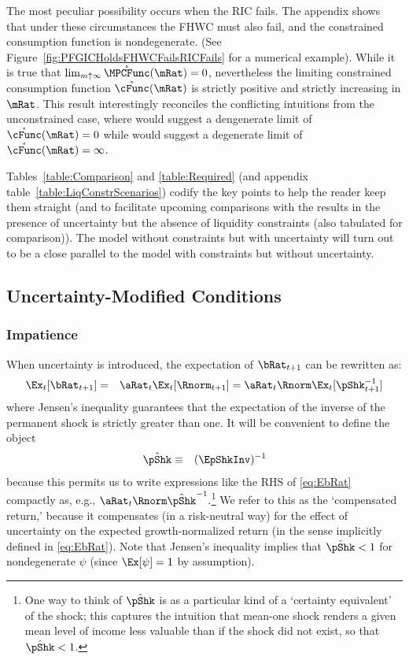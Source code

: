 \documentclass[titlepage]{\econtex}\providecommand{\texname}{BufferStockTheory}
\begin{document}
The most peculiar possibility occurs when the RIC fails.  The appendix shows that under these circumstances the FHWC
must also fail, and the constrained consumption function is nondegenerate.  (See Figure~\ref{fig:PFGICHoldsFHWCFailsRICFails} for a numerical example).  While it is true that $\lim_{m \uparrow \infty}
\mathring{\MPCFunc}(\mRat) = 0$, nevertheless the limiting constrained
consumption function $\mathring{\cFunc}(\mRat)$ is strictly positive
and strictly increasing in $\mRat$.  This result interestingly
reconciles the conflicting intuitions from the unconstrained case,
where  would suggest a dengenerate limit of
$\mathring{\cFunc}(\mRat)=0$ while  would suggest a
degenerate limit of $\mathring{\cFunc}(\mRat)=\infty$.

Tables~\ref{table:Comparison} and \ref{table:Required} (and appendix
table~\ref{table:LiqConstrScenarios}) codify the key points to help
the reader keep them straight (and to facilitate upcoming comparisons
with the results in the presence of uncertainty
but the absence of liquidity constraints (also tabulated for comparison)).  The model without constraints but with uncertainty will turn out to be a close parallel to the model with constraints but without uncertainty.

\hypertarget{Uncertainty-Modified-Conditions}{}
\subsection{Uncertainty-Modified Conditions}
\subsubsection{Impatience}

When uncertainty is introduced, the expectation of $\bRat_{t+1}$ can be rewritten as:
\begin{eqnarray}
  \Ex_{t}[\bRat_{t+1}] & = &  \aRat_{t}\Ex_{t}[\Rnorm_{t+1}] = \aRat_{t}\Rnorm\Ex_{t}[\pShk_{t+1}^{-1}] \label{eq:EbRat}
\end{eqnarray}
where Jensen's inequality guarantees that the expectation of the inverse of the permanent
shock is strictly greater than one.  It will be convenient to define the object
\begin{eqnarray*}
  \InvEpShkInv & \equiv & (\EpShkInv)^{-1}
\end{eqnarray*}
because this permits us to write expressions like the RHS of
\eqref{eq:EbRat} compactly as, e.g., $\aRat_{t}\Rnorm
\InvEpShkInv^{-1}.$\footnote{One way to think of $\InvEpShkInv$ is as
  a particular kind of a `certainty equivalent' of the shock; this
  captures the intuition that mean-one shock renders a given mean
  level of income less valuable than if the shock did not exist, so
  that $\InvEpShkInv < 1$.}  We refer to this as the `compensated return,' because it compensates (in a risk-neutral way) for the effect of
uncertainty on the expected growth-normalized return (in the sense implicitly defined in
\eqref{eq:EbRat}).  Note that Jensen's inequality implies that $\InvEpShkInv < 1$ for nondegenerate $\psi$ (since
$\Ex[\psi]=1$ by assumption).
\end{document}
